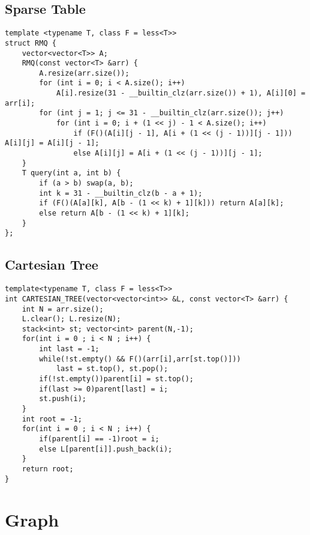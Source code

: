 \documentclass[landscape, 8pt, a4paper, oneside]{extarticle}
\begin{document}
\begin{multicols}{3}
\subsection{Sparse Table}
\begin{verbatim}
template <typename T, class F = less<T>>
struct RMQ {
    vector<vector<T>> A;
    RMQ(const vector<T> &arr) {
        A.resize(arr.size());
        for (int i = 0; i < A.size(); i++)
            A[i].resize(31 - __builtin_clz(arr.size()) + 1), A[i][0] = arr[i];
        for (int j = 1; j <= 31 - __builtin_clz(arr.size()); j++)
            for (int i = 0; i + (1 << j) - 1 < A.size(); i++)
                if (F()(A[i][j - 1], A[i + (1 << (j - 1))][j - 1])) A[i][j] = A[i][j - 1];
                else A[i][j] = A[i + (1 << (j - 1))][j - 1];
    }
    T query(int a, int b) {
        if (a > b) swap(a, b);
        int k = 31 - __builtin_clz(b - a + 1);
        if (F()(A[a][k], A[b - (1 << k) + 1][k])) return A[a][k];
        else return A[b - (1 << k) + 1][k];
    }
};
\end{verbatim}
\subsection{Cartesian Tree}
\begin{verbatim}
template<typename T, class F = less<T>>
int CARTESIAN_TREE(vector<vector<int>> &L, const vector<T> &arr) {
    int N = arr.size();
    L.clear(); L.resize(N);
    stack<int> st; vector<int> parent(N,-1);
    for(int i = 0 ; i < N ; i++) {
        int last = -1;
        while(!st.empty() && F()(arr[i],arr[st.top()]))
            last = st.top(), st.pop();
        if(!st.empty())parent[i] = st.top();
        if(last >= 0)parent[last] = i;
        st.push(i);
    }
    int root = -1;
    for(int i = 0 ; i < N ; i++) {
        if(parent[i] == -1)root = i;
        else L[parent[i]].push_back(i);
    }
    return root;
}
\end{verbatim}
\section{Graph}

\end{multicols}
\end{document}
